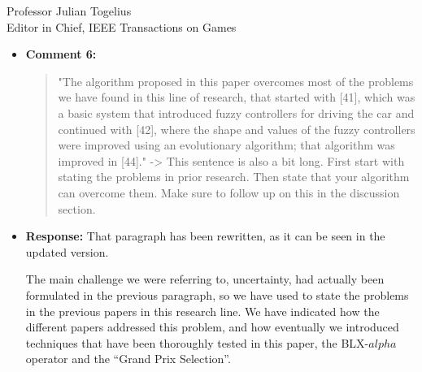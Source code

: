 \documentclass[10pt]{letter} %
\begin{document}
\begin{letter}{Professor Julian Togelius \\ Editor in Chief, IEEE Transactions on Games}
\begin{enumerate}
\begin{itemize}
				\textcolor{red}{
					If we can eliminate fitness, we can remove a source of uncertainty. We accomplish this by substituting a single (and uncertain) fitness  by a podium (a ranking after several races against other opponents) in which car controllers that win the most races will proceed to the next generation, while those that do not, will simply be removed from the pool. We can further reduce uncertainty even more by repeating races several times."
				}
		\item {\bf Comment 6:}
			\begin{quote}
				"The algorithm proposed in this paper overcomes most of the problems we have found in this line of research, that started with [41], which was a basic system that introduced fuzzy controllers for driving the car and continued with [42], where the shape and values of the fuzzy controllers were improved using an evolutionary algorithm; that algorithm
				was improved in [44]." -> This sentence is also a bit long. First start with stating the problems in prior research. Then state that your algorithm can overcome them. Make sure to follow up on this in the discussion section.
			\end{quote}
		\item {\bf Response:}
                  That paragraph has been rewritten, as it can be seen
                  in the updated version.

                 The main challenge we were referring to, uncertainty, had actually been formulated in the
previous paragraph, so we have used to state the problems in the
previous papers in this research line. We have indicated how the
different papers addressed this problem, and how eventually we
introduced techniques that have been thoroughly tested in this paper,
the BLX-$alpha$ operator and the ``Grand Prix Selection''.


\end{itemize}
\end{enumerate}
\end{letter}
\end{document}
